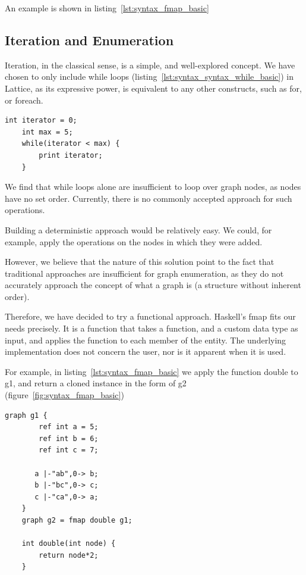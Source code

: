 An example is shown in listing~\ref{lst:syntax_fmap_basic}

\subsection{Iteration and Enumeration}\label{subsec:syntax_iteration-and-enumeration}
Iteration, in the classical sense, is a simple, and well-explored concept.
We have chosen to only include while loops (listing~\ref{lst:syntax_syntax_while_basic})
in Lattice, as its expressive power, is equivalent to any other constructs, such as for, or foreach.

\begin{lstlisting}[caption={Simple while loop.},captionpos=b,label={lst:syntax_syntax_while_basic}]
    int iterator = 0;
    int max = 5;
    while(iterator < max) {
        print iterator;
    }
\end{lstlisting}


We find that while loops alone are insufficient to loop over graph nodes, as nodes have no set order.
Currently, there is no commonly accepted approach for such operations.

Building a deterministic approach would be relatively easy.
We could, for example, apply the operations on the nodes in which
they were added.

However, we believe that the nature of this solution point to the fact that traditional approaches are insufficient for
graph enumeration, as they do not accurately approach the concept of what a graph is (a structure without inherent
order).

Therefore, we have decided to try a functional approach.
Haskell's fmap fits our needs precisely.
It is a function that takes a function, and a custom data type as input, and applies the function to each member of
the entity.
The underlying implementation does not concern the user, nor is it apparent when it is used.

For example, in listing~\ref{lst:syntax_fmap_basic} we apply the function double to g1, and return a cloned instance
in the form of g2 (figure~\ref{fig:syntax_fmap_basic})

\begin{lstlisting}[caption={Simple fmap application on a graph.},captionpos=b,label={lst:syntax_fmap_basic}]
    graph g1 {
        ref int a = 5;
        ref int b = 6;
        ref int c = 7;

       a |-"ab",0-> b;
       b |-"bc",0-> c;
       c |-"ca",0-> a;
    }
    graph g2 = fmap double g1;

    int double(int node) {
        return node*2;
    }
\end{lstlisting}

